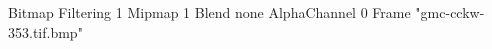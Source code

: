 {Bitmap
	{Filtering 1}
	{Mipmap 1}
	{Blend none}
	{AlphaChannel 0}
	{Frame "gmc-cckw-353.tif.bmp"}
}
